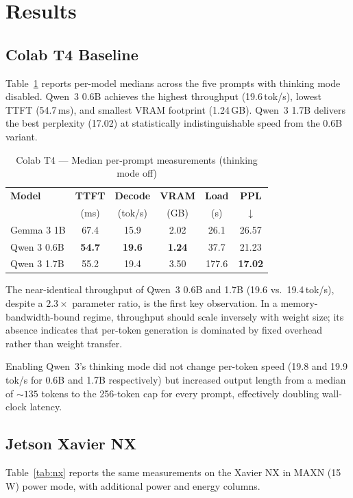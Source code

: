 \documentclass[conference]{IEEEtran}
\begin{document}
\section{Results}

\subsection{Colab T4 Baseline}
Table~\ref{tab:colab} reports per-model medians across the five prompts with thinking mode disabled. Qwen~3 0.6B achieves the highest throughput (19.6\,tok/s), lowest TTFT (54.7\,ms), and smallest VRAM footprint (1.24\,GB). Qwen~3 1.7B delivers the best perplexity (17.02) at statistically indistinguishable speed from the 0.6B variant.

\begin{table}[t]
\caption{Colab T4 — Median per-prompt measurements (thinking mode off)}
\label{tab:colab}
\centering
\renewcommand{\arraystretch}{1.2}
\begin{tabular}{lccccc}
\toprule
\textbf{Model} & \textbf{TTFT} & \textbf{Decode} & \textbf{VRAM} & \textbf{Load} & \textbf{PPL} \\
 & (ms) & (tok/s) & (GB) & (s) & $\downarrow$ \\
\midrule
Gemma 3 1B  & 67.4 & 15.9 & 2.02 & 26.1 & 26.57 \\
\rowcolor{lightgreen} Qwen 3 0.6B & \textbf{54.7} & \textbf{19.6} & \textbf{1.24} & 37.7 & 21.23 \\
Qwen 3 1.7B & 55.2 & 19.4 & 3.50 & 177.6 & \textbf{17.02} \\
\bottomrule
\end{tabular}
\end{table}

The near-identical throughput of Qwen~3 0.6B and 1.7B (19.6 vs.\ 19.4\,tok/s), despite a $2.3\times$ parameter ratio, is the first key observation. In a memory-bandwidth-bound regime, throughput should scale inversely with weight size; its absence indicates that per-token generation is dominated by fixed overhead rather than weight transfer.

Enabling Qwen~3's thinking mode did not change per-token speed (19.8 and 19.9\,tok/s for 0.6B and 1.7B respectively) but increased output length from a median of ${\sim}135$ tokens to the 256-token cap for every prompt, effectively doubling wall-clock latency.

\subsection{Jetson Xavier NX}
Table~\ref{tab:nx} reports the same measurements on the Xavier NX in MAXN (15\,W) power mode, with additional power and energy columns.
\end{document}
